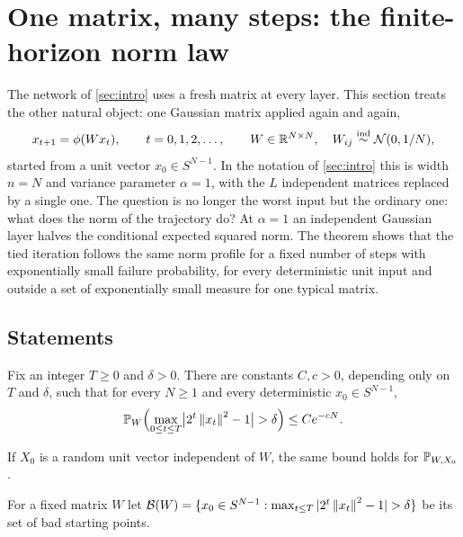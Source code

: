 \section{One matrix, many steps: the finite-horizon norm law}
\label{sec:horizon}

The network of \cref{sec:intro} uses a fresh matrix at every layer. This section treats the other natural object: one Gaussian matrix applied again and again,
\begin{equation}\label{eq:fh-dyn}
x_{t+1}=\phi(Wx_t),\qquad t=0,1,2,\dots,\qquad W\in\mathbb{R}^{N\times N},\quad W_{ij}\overset{\text{ind}}{\sim}\mathcal N(0,1/N),
\end{equation}
started from a unit vector $x_0\in S^{N-1}$. In the notation of \cref{sec:intro} this is width $n=N$ and variance parameter $\alpha=1$, with the $L$ independent matrices replaced by a single one. The question is no longer the worst input but the ordinary one: what does the norm of the trajectory do? At $\alpha=1$ an independent Gaussian layer halves the conditional expected squared norm. The theorem shows that the tied iteration follows the same norm profile for a fixed number of steps with exponentially small failure probability, for every deterministic unit input and outside a set of exponentially small measure for one typical matrix. 

\subsection{Statements}

\begin{theorem}\label{thm:fh}
Fix an integer $T\ge0$ and $\delta>0$. There are constants $C,c>0$, depending only on $T$ and $\delta$, such that for every $N\ge1$ and every deterministic $x_0\in S^{N-1}$,
\begin{equation}\label{eq:fh-main}
\PP_W\Bigl(\max_{0\le t\le T}\bigl|2^t\norm{x_t}^2-1\bigr|>\delta\Bigr)\le Ce^{-cN}.
\end{equation}
\end{theorem}

\begin{corollary}\label{cor:fh-random}
If $X_0$ is a random unit vector independent of $W$, the same bound holds for $\mathbb{P}_{W,X_0}$.
\end{corollary}

For a fixed matrix $W$ let $\mathcal B(W)=\{x_0\in S^{N-1}:\max_{t\le T}|2^t\norm{x_t}^2-1|>\delta\}$ be its set of bad starting points.

